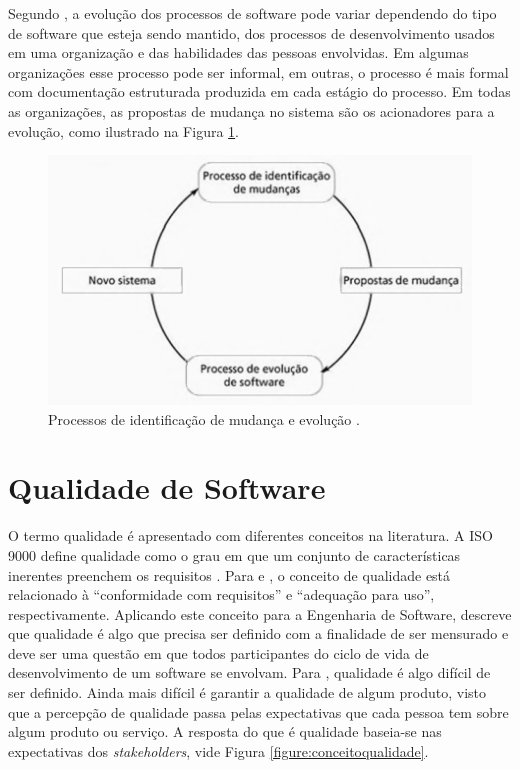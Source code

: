 Segundo , a evolução dos processos de software pode variar dependendo do tipo de software que esteja sendo mantido, dos processos de desenvolvimento usados em uma organização e das habilidades das pessoas envolvidas. Em algumas organizações esse processo pode ser informal, em outras, o processo é mais formal com documentação estruturada produzida em cada estágio do processo. Em todas as organizações, as propostas de mudança no sistema são os acionadores para a evolução, como ilustrado na Figura \ref{figure:propostasdemudanca}.

\begin{figure}[!htb]
\centering
\includegraphics[width=.5\textwidth]{images/propostasdemudanca.png}
\caption{Processos de identificação de mudança e evolução \cite{sommerville2011engenharia}.}
\label{figure:propostasdemudanca}
\end{figure}


\section{Qualidade de Software}\label{sec:qualidadedesoftware}


O termo qualidade é apresentado com diferentes conceitos na literatura. A ISO 9000 define qualidade como o grau
em que um conjunto de características inerentes preenchem os requisitos \cite{iso9000}. Para  e , o conceito de qualidade está relacionado à ``conformidade com requisitos'' e ``adequação para
uso'', respectivamente. Aplicando este conceito para a Engenharia de Software,  descreve que qualidade é algo que precisa ser definido com a finalidade de ser mensurado e deve ser uma questão em que todos participantes do ciclo de vida de desenvolvimento de um software se envolvam. Para , qualidade é algo difícil de ser definido. Ainda mais difícil é garantir a qualidade de algum produto, visto que a percepção de qualidade passa pelas expectativas que cada pessoa tem sobre algum produto ou serviço. A resposta do que é qualidade baseia-se nas expectativas dos \textit{stakeholders}, vide Figura \ref{figure:conceitoqualidade}.


